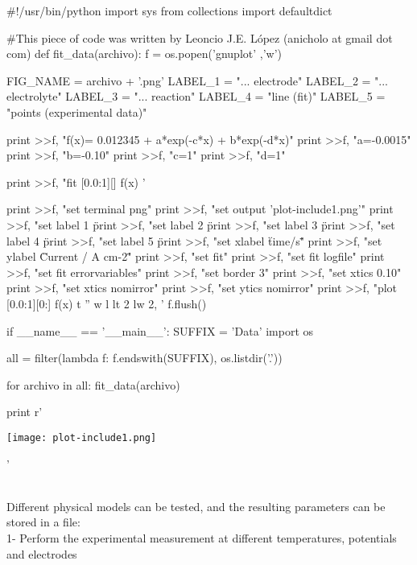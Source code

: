 \documentclass[a4paper]{article}
\begin{document}
\begin{python}
#!/usr/bin/python
import sys
from collections import defaultdict

#This piece of code was written by Leoncio J.E. L\'opez (anicholo at gmail dot com)
def fit_data(archivo):
    f = os.popen('gnuplot' ,'w')

    FIG_NAME = archivo + '.png'
    LABEL_1 = "... electrode"
    LABEL_2 = "... electrolyte"
    LABEL_3 = "... reaction"
    LABEL_4 = "line (fit)"
    LABEL_5 = "points (experimental data)"

    print >>f, "f(x)= 0.012345 + a*exp(-c*x) + b*exp(-d*x)"
    print >>f, "a=-0.0015"
    print >>f, "b=-0.10"
    print >>f, "c=1"
    print >>f, "d=1"

    print >>f, "fit [0.0:1][] f(x) '%

    print >>f, "set terminal png"
    print >>f, "set output 'plot-include1.png'"
    print >>f, "set label 1 \"%
    print >>f, "set label 2 \"%
    print >>f, "set label 3 \"%
    print >>f, "set label 4 \"%
    print >>f, "set label 5 \"%
    print >>f, "set xlabel \"time/s\""
    print >>f, "set ylabel \"Current / A cm-2\""
    print >>f, "set fit"
    print >>f, "set fit logfile"
    print >>f, "set fit errorvariables"
    print >>f, "set border 3"
    print >>f, "set xtics 0.10"
    print >>f, "set xtics nomirror"
    print >>f, "set ytics nomirror"
    print >>f, "plot [0.0:1][0:] f(x) t '' w l lt 2 lw 2, '%
    f.flush()

if __name__ == '__main__':
    SUFFIX = 'Data'
    import os

    all = filter(lambda f: f.endswith(SUFFIX), os.listdir('.'))

    for archivo in all:
        fit_data(archivo)

    print r'\begin{center}{\texttt{[image: plot-include1.png]}}\end{center}'
\end{python}
\\
Different physical models can be tested, and the resulting parameters can be stored in a file:\\ 

1- Perform the experimental measurement at different temperatures, potentials and electrodes\\
\end{document}
